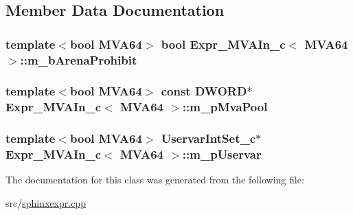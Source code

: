 \subsection{Member Data Documentation}
\hypertarget{classExpr__MVAIn__c_aaea1fe0f80dae5bf3657d698ee8a6566}{
\subsubsection[{m\-\_\-b\-Arena\-Prohibit}]{\setlength{\rightskip}{0pt plus 5cm}template$<$bool M\-V\-A64$>$ bool {\bf Expr\-\_\-\-M\-V\-A\-In\-\_\-c}$<$ M\-V\-A64 $>$\-::m\-\_\-b\-Arena\-Prohibit\hspace{0.3cm}{\ttfamily [protected]}}}\label{classExpr__MVAIn__c_aaea1fe0f80dae5bf3657d698ee8a6566}
\hypertarget{classExpr__MVAIn__c_ab673ee7c1d4934597166ac7562143a03}{
\subsubsection[{m\-\_\-p\-Mva\-Pool}]{\setlength{\rightskip}{0pt plus 5cm}template$<$bool M\-V\-A64$>$ const {\bf D\-W\-O\-R\-D}$\ast$ {\bf Expr\-\_\-\-M\-V\-A\-In\-\_\-c}$<$ M\-V\-A64 $>$\-::m\-\_\-p\-Mva\-Pool\hspace{0.3cm}{\ttfamily [protected]}}}\label{classExpr__MVAIn__c_ab673ee7c1d4934597166ac7562143a03}
\hypertarget{classExpr__MVAIn__c_a847441feb20d50541d5cb4ddb7155d89}{
\subsubsection[{m\-\_\-p\-Uservar}]{\setlength{\rightskip}{0pt plus 5cm}template$<$bool M\-V\-A64$>$ {\bf Uservar\-Int\-Set\-\_\-c}$\ast$ {\bf Expr\-\_\-\-M\-V\-A\-In\-\_\-c}$<$ M\-V\-A64 $>$\-::m\-\_\-p\-Uservar\hspace{0.3cm}{\ttfamily [protected]}}}\label{classExpr__MVAIn__c_a847441feb20d50541d5cb4ddb7155d89}


The documentation for this class was generated from the following file\-:\begin{DoxyCompactItemize}
\item 
src/\hyperlink{sphinxexpr_8cpp}{sphinxexpr.\-cpp}\end{DoxyCompactItemize}
